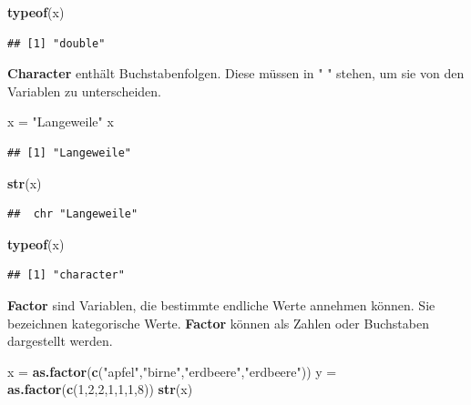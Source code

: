 \documentclass[]{book}
\newenvironment{Shaded}{\begin{snugshade}}{\end{snugshade}}
\newcommand{\KeywordTok}[1]{\textcolor[rgb]{0.13,0.29,0.53}{\textbf{#1}}}
\newcommand{\DecValTok}[1]{\textcolor[rgb]{0.00,0.00,0.81}{#1}}
\newcommand{\StringTok}[1]{\textcolor[rgb]{0.31,0.60,0.02}{#1}}
\newcommand{\NormalTok}[1]{#1}
\begin{document}
\begin{Shaded}
\begin{Highlighting}[]
\KeywordTok{typeof}\NormalTok{(x)}
\end{Highlighting}
\end{Shaded}

\begin{verbatim}
## [1] "double"
\end{verbatim}

\textbf{Character} enthält Buchstabenfolgen. Diese müssen in " " stehen,
um sie von den Variablen zu unterscheiden.

\begin{Shaded}
\begin{Highlighting}[]
\NormalTok{x =}\StringTok{ "Langeweile"}
\NormalTok{x}
\end{Highlighting}
\end{Shaded}

\begin{verbatim}
## [1] "Langeweile"
\end{verbatim}

\begin{Shaded}
\begin{Highlighting}[]
\KeywordTok{str}\NormalTok{(x)}
\end{Highlighting}
\end{Shaded}

\begin{verbatim}
##  chr "Langeweile"
\end{verbatim}

\begin{Shaded}
\begin{Highlighting}[]
\KeywordTok{typeof}\NormalTok{(x)}
\end{Highlighting}
\end{Shaded}

\begin{verbatim}
## [1] "character"
\end{verbatim}

\textbf{Factor} sind Variablen, die bestimmte endliche Werte annehmen
können. Sie bezeichnen kategorische Werte. \textbf{Factor} können als
Zahlen oder Buchstaben dargestellt werden.

\begin{Shaded}
\begin{Highlighting}[]
\NormalTok{x =}\StringTok{ }\KeywordTok{as.factor}\NormalTok{(}\KeywordTok{c}\NormalTok{(}\StringTok{"apfel"}\NormalTok{,}\StringTok{"birne"}\NormalTok{,}\StringTok{"erdbeere"}\NormalTok{,}\StringTok{"erdbeere"}\NormalTok{))}
\NormalTok{y =}\StringTok{ }\KeywordTok{as.factor}\NormalTok{(}\KeywordTok{c}\NormalTok{(}\DecValTok{1}\NormalTok{,}\DecValTok{2}\NormalTok{,}\DecValTok{2}\NormalTok{,}\DecValTok{1}\NormalTok{,}\DecValTok{1}\NormalTok{,}\DecValTok{1}\NormalTok{,}\DecValTok{8}\NormalTok{))}
\KeywordTok{str}\NormalTok{(x)}
\end{Highlighting}
\end{Shaded}
\end{document}
